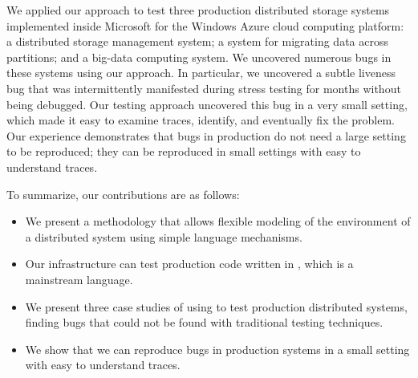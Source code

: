 We applied our approach to test three production distributed storage systems implemented inside Microsoft for the Windows Azure cloud computing
platform: a distributed storage management system; a system for migrating data across partitions; and a big-data computing system.
We uncovered numerous bugs in these systems using our approach.
In particular, we uncovered a subtle liveness bug that was intermittently manifested during stress testing for months without being debugged.
Our testing approach uncovered this bug in a very small setting, which made it easy to examine traces, identify, and eventually fix the problem.
Our experience demonstrates that bugs in production do not need a large setting to be reproduced;
they can be reproduced in small settings with easy to understand traces.

To summarize, our contributions are as follows:
\begin{itemize}
\item We present a methodology that allows flexible modeling of the environment of a distributed system using simple language mechanisms.
\item Our infrastructure can test production code written in \csharp, which is a mainstream language.
\item We present three case studies of using \psharp to test production distributed systems, finding bugs that could not be found with traditional testing techniques.
\item We show that we can reproduce bugs in production systems in a small setting with easy to understand traces.
\end{itemize}


